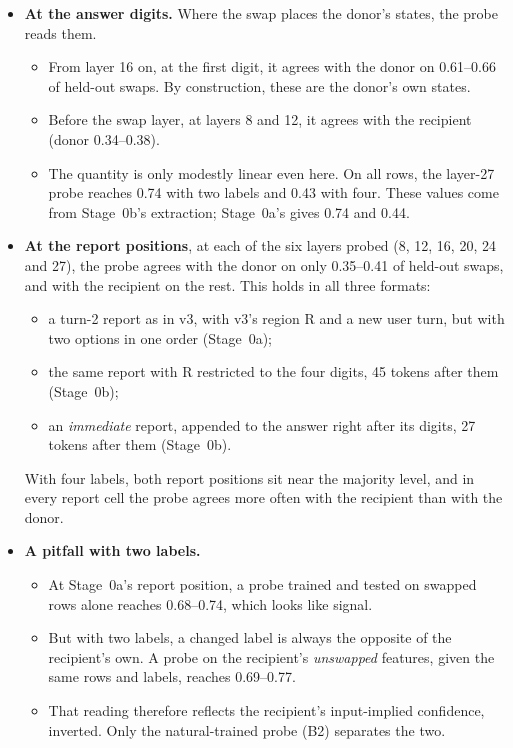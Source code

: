 \documentclass[11pt]{article}
\begin{document}
\begin{itemize}
\item \textbf{At the answer digits.} Where the swap places the donor's states, the probe reads them.
  \begin{itemize}
  \item From layer 16 on, at the first digit, it agrees with the donor on 0.61--0.66 of held-out swaps. By construction, these are the donor's own states.
  \item Before the swap layer, at layers 8 and 12, it agrees with the recipient (donor 0.34--0.38).
  \item The quantity is only modestly linear even here. On all rows, the layer-27 probe reaches 0.74 with two labels and 0.43 with four. These values come from Stage~0b's extraction; Stage~0a's gives 0.74 and 0.44.
  \end{itemize}
\item \textbf{At the report positions}, at each of the six layers probed (8, 12, 16, 20, 24 and 27), the probe agrees with the donor on only 0.35--0.41 of held-out swaps, and with the recipient on the rest. This holds in all three formats:
  \begin{itemize}
  \item a turn-2 report as in v3, with v3's region R and a new user turn, but with two options in one order (Stage~0a);
  \item the same report with R restricted to the four digits, 45 tokens after them (Stage~0b);
  \item an \emph{immediate} report, appended to the answer right after its digits, 27 tokens after them (Stage~0b).
  \end{itemize}
  With four labels, both report positions sit near the majority level, and in every report cell the probe agrees more often with the recipient than with the donor.
\item \textbf{A pitfall with two labels.}
  \begin{itemize}
  \item At Stage~0a's report position, a probe trained and tested on swapped rows alone reaches 0.68--0.74, which looks like signal.
  \item But with two labels, a changed label is always the opposite of the recipient's own. A probe on the recipient's \emph{unswapped} features, given the same rows and labels, reaches 0.69--0.77.
  \item That reading therefore reflects the recipient's input-implied confidence, inverted. Only the natural-trained probe (B2) separates the two.
  \end{itemize}
\end{itemize}
\end{document}
